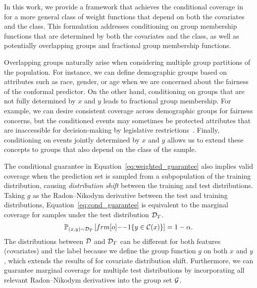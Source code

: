 In this work, we provide a framework that achieves the conditional coverage in  for a more general class of weight functions that depend on both the covariates and the class. This formulation addresses conditioning on group membership functions that are determined by both the covariates and the class, as well as potentially overlapping groups and fractional group membership functions.


Overlapping groups naturally arise when considering multiple group partitions of the population. For instance, we can define demographic groups based on attributes such as race, gender, or age when we are concerned about the fairness of the conformal predictor. 
On the other hand, conditioning on groups that are not fully determined by $x$ and $y$ leads to fractional group membership. For example, we can desire consistent coverage across demographic groups for fairness concerns, but the conditioned events may sometimes be protected attributes that are inaccessible for decision-making by legislative restrictions~\citep{RBSC20}. Finally, conditioning on events jointly determined by $x$ and $y$ allows us to extend these concepts to groups that also depend on the class of the sample. 






The conditional guarantee in Equation~\ref{eq:weighted_guarantee} also implies valid coverage when the prediction set is sampled from a subpopulation of the training distribution, causing \emph{distribution shift} between the training and test distributions. Taking $g$ as the Radon–Nikodym derivative between the test and training distributions, Equation~\ref{eq:cond_guarantee} is equivalent to the marginal coverage for samples under the test distribution ${\cal D}_T$.
\begin{align*}
	\PP_{(x,y) \sim \calD_{T}} \left[ \11\{y \in \calC(x)\} \right]= 1-\alpha.
\end{align*}
The distributions between ${\cal D}$ and ${\cal D}_T$ can be different for both features (covariates) and the label because we define the group function $g$ on both $x$ and $y$, which extends the results of \citet{GCC2023} for covariate distribution shift. Furthermore, we can guarantee marginal coverage for multiple test distributions by incorporating all relevant Radon–Nikodym derivatives into the group set ${\cal G}$.
\fi



